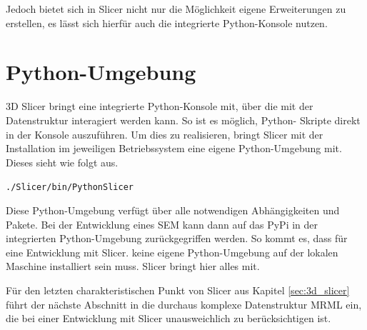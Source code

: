 Jedoch bietet sich in Slicer nicht nur die Möglichkeit eigene Erweiterungen zu
erstellen, es lässt sich hierfür auch die integrierte Python-Konsole nutzen.

\section{Python-Umgebung}
\label{subsec:pythob_umgebung} 3D Slicer bringt eine integrierte Python-Konsole mit,
über die mit der Datenstruktur interagiert werden kann. So ist es möglich,
Python- Skripte direkt in der Konsole auszuführen. Um dies zu realisieren, bringt
Slicer mit der Installation im jeweiligen Betriebssystem eine eigene Python-Umgebung
mit. Dieses sieht wie folgt aus.

\begin{center}
	\texttt{./Slicer/bin/PythonSlicer}
\end{center}

Diese Python-Umgebung verfügt über alle notwendigen Abhängigkeiten und Pakete.
Bei der Entwicklung eines \ac{SEM} kann dann auf das \ac{PyPi} in der
integrierten Python-Umgebung zurückgegriffen werden. So kommt es, dass für eine
Entwicklung mit Slicer. keine eigene Python-Umgebung auf der lokalen Maschine installiert
sein muss. Slicer bringt hier alles mit.

Für den letzten charakteristischen Punkt von Slicer aus Kapitel
\ref{sec:3d_slicer} führt der nächste Abschnitt in die durchaus komplexe
Datenstruktur \ac{MRML} ein, die bei einer Entwicklung mit Slicer unausweichlich
zu berücksichtigen ist.

